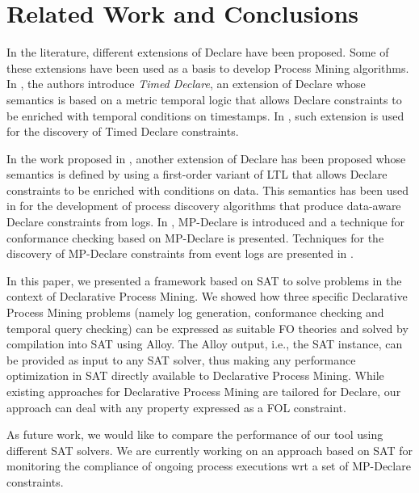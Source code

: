 \section{Related Work and Conclusions}
In the literature, different extensions of Declare have been proposed. Some of these extensions have been used as a basis to develop Process Mining algorithms.
In \cite{Westergaard.Maggi/CoopIS2012:LookingintoFuture,DBLP:journals/ijcis/MaggiW14}, the authors introduce \emph{Timed Declare}, an extension of Declare whose semantics is based on a metric temporal logic that allows Declare constraints to be enriched with temporal conditions on timestamps. In \cite{DBLP:conf/bir/Maggi14}, such extension is used for the discovery of Timed Declare constraints.

In the work proposed in \cite{Maggi.etal/BPM2013:DiscoveringDataAware}, another extension of Declare has been proposed whose semantics is defined by using a first-order variant of LTL that allows Declare constraints to be enriched with conditions on data. This semantics has been used in \cite{Maggi.etal/BPM2013:DiscoveringDataAware,DBLP:conf/bpm/BoseMA13} for the development of process discovery algorithms that produce data-aware Declare constraints from logs. In \cite{DBLP:journals/eswa/BurattinMS16}, MP-Declare is introduced and a technique for conformance checking based on MP-Declare is presented. Techniques for the discovery of MP-Declare constraints from event logs are presented in \cite{DBLP:conf/bpm/LenoDM18,Schoenig.etal/ICSOC2016:DiscoveryMultiperspectiveDeclare}.


In this paper, we presented a framework based on SAT to solve problems in the context of Declarative Process Mining.
We showed how three specific Declarative Process Mining problems (namely log generation, conformance checking and temporal query checking) can be expressed as suitable FO theories and solved by compilation into SAT using Alloy. The Alloy output, i.e., the SAT instance, can be provided as input to any SAT solver, thus making any performance optimization in SAT directly
available to Declarative Process Mining. While existing approaches for Declarative Process Mining are tailored for Declare, our approach can deal with any property expressed as a FOL constraint.

As future work, we would like to compare the performance of our tool using different SAT solvers. We are currently working on an approach based on SAT for monitoring the compliance of ongoing process executions wrt a set of MP-Declare constraints.  
